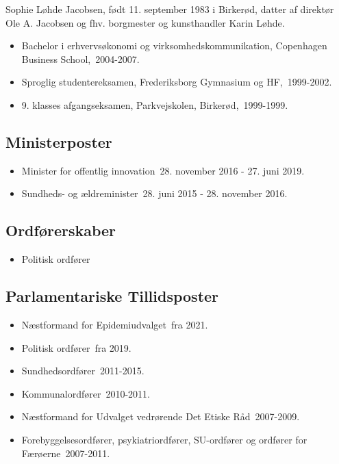 \documentclass[11pt, a4paper]{awesome-cv}
\begin{document}
\makecvheader[R]
\makelettertitle
\begin{cvletter}
Sophie Løhde Jacobsen, født 11. september 1983 i Birkerød, datter af direktør Ole A. Jacobsen og fhv. borgmester og kunsthandler Karin Løhde.

\begin{itemize}
\item Bachelor i erhvervsøkonomi og virksomhedskommunikation, Copenhagen Business School, 2004-2007.
\item Sproglig studentereksamen, Frederiksborg Gymnasium og HF, 1999-2002.
\item 9. klasses afgangseksamen, Parkvejskolen, Birkerød, 1999-1999.
\end{itemize}
\subsection*{Ministerposter}
\begin{itemize}
\item Minister for offentlig innovation 28. november 2016 - 27. juni 2019.
\item Sundheds- og ældreminister 28. juni 2015 - 28. november 2016.
\end{itemize}
\subsection*{Ordførerskaber}
\begin{itemize}
\item Politisk ordfører
\end{itemize}
\subsection*{Parlamentariske Tillidsposter}
\begin{itemize}
\item Næstformand for Epidemiudvalget fra 2021.
\item Politisk ordfører fra 2019.
\item Sundhedsordfører 2011-2015.
\item Kommunalordfører 2010-2011.
\item Næstformand for Udvalget vedrørende Det Etiske Råd 2007-2009.
\item Forebyggelsesordfører, psykiatriordfører, SU-ordfører og ordfører for Færøerne 2007-2011.
\end{itemize}

\end{cvletter}
\end{document}
